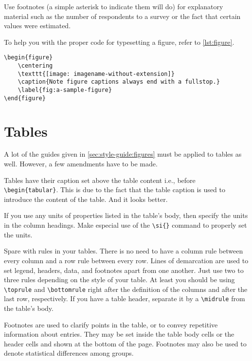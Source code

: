 Use footnotes (a simple asterisk to indicate them will do) for explanatory material such as the number of respondents to a survey or the fact that certain values were estimated.

To help you with the proper code for typesetting a figure, refer to \cref{lst:figure}.

\begin{lstlisting}[float,language={[LaTeX]TeX}, caption={Sample code for type setting a figure.},label={lst:figure}]
\begin{figure}
    \centering
    \texttt{[image: imagename-without-extension]}
    \caption{Note figure captions always end with a fullstop.}
    \label{fig:a-sample-figure}
\end{figure}
\end{lstlisting}



\section{Tables}\label{sec:style-guide:tables}

A lot of the guides given in \cref{sec:style-guide:figures} must be applied to tables as well.
However, a few amendments have to be made.

Tables have their caption set above the table content i.e., before \lstinline!\begin{tabular}!.
This is due to the fact that the table caption is used to introduce the content of the table.
And it looks better.

If you use any units of properties listed in the table's body, then specify the units in the column headings.
Make especial use of the \lstinline!\si{}! command to properly set the units.

Spare with rules in your tables.
There is no need to have a column rule between every column and a row rule between every row.
Lines of demarcation are used to set legend, headers, data, and footnotes apart from one another.
Just use two to three rules depending on the style of your table.
At least you should be using \lstinline!\toprule! and \lstinline!\bottomrule! right after the definition of the columns and after the last row, respectively.
If you have a table header, separate it by a \lstinline!\midrule! from the table's body.

Footnotes are used to clarify points in the table, or to convey repetitive information about entries.
They may be set inside the table body cells or the header cells and shown at the bottom of the page.
Footnotes may also be used to denote statistical differences among groups.

